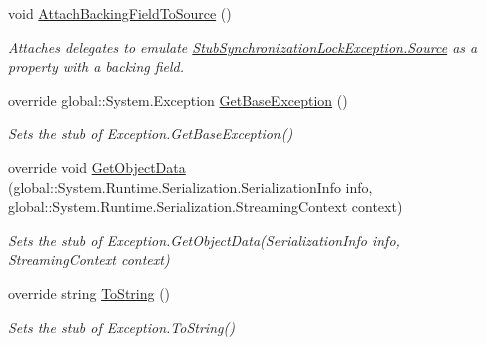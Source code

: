 \begin{DoxyCompactItemize}
void \hyperlink{class_system_1_1_threading_1_1_fakes_1_1_stub_synchronization_lock_exception_a0f068302e5237499e69e53bb98d6ae01}{Attach\-Backing\-Field\-To\-Source} ()
\begin{DoxyCompactList}\small\item\em Attaches delegates to emulate \hyperlink{class_system_1_1_threading_1_1_fakes_1_1_stub_synchronization_lock_exception_a1309954fb5ad892b124965eb5963d263}{Stub\-Synchronization\-Lock\-Exception.\-Source} as a property with a backing field.\end{DoxyCompactList}\item 
override global\-::\-System.\-Exception \hyperlink{class_system_1_1_threading_1_1_fakes_1_1_stub_synchronization_lock_exception_a713276c73c457f6c1d20db10ae20b812}{Get\-Base\-Exception} ()
\begin{DoxyCompactList}\small\item\em Sets the stub of Exception.\-Get\-Base\-Exception()\end{DoxyCompactList}\item 
override void \hyperlink{class_system_1_1_threading_1_1_fakes_1_1_stub_synchronization_lock_exception_a47e4f9125adb263d628278485137bc64}{Get\-Object\-Data} (global\-::\-System.\-Runtime.\-Serialization.\-Serialization\-Info info, global\-::\-System.\-Runtime.\-Serialization.\-Streaming\-Context context)
\begin{DoxyCompactList}\small\item\em Sets the stub of Exception.\-Get\-Object\-Data(\-Serialization\-Info info, Streaming\-Context context)\end{DoxyCompactList}\item 
override string \hyperlink{class_system_1_1_threading_1_1_fakes_1_1_stub_synchronization_lock_exception_a46f4a8d98274c725553af4066d1fe890}{To\-String} ()
\begin{DoxyCompactList}\small\item\em Sets the stub of Exception.\-To\-String()\end{DoxyCompactList}\end{DoxyCompactItemize}

